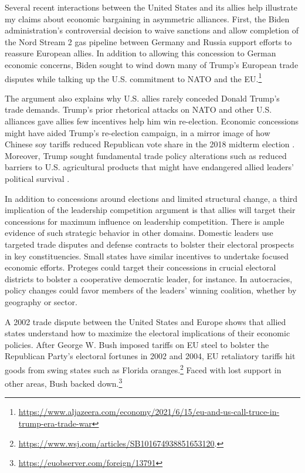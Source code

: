 \documentclass[12pt]{article}
\begin{document}
Several recent interactions between the United States and its allies help illustrate my claims about economic bargaining in asymmetric alliances. 
First, the Biden administration's controversial decision to waive sanctions and allow completion of the Nord Stream 2 gas pipeline between Germany and Russia support efforts to reassure European allies. 
In addition to allowing this concession to German economic concerns, Biden sought to wind down many of Trump's European trade disputes while talking up the U.S. commitment to NATO and the EU.\footnote{\url{https://www.aljazeera.com/economy/2021/6/15/eu-and-us-call-truce-in-trump-era-trade-war}}


The argument also explains why U.S. allies rarely conceded Donald Trump's trade demands. 
Trump's prior rhetorical attacks on NATO and other U.S. alliances gave allies few incentives help him win re-election. 
Economic concessions might have aided Trump's re-election campaign, in a mirror image of how Chinese soy tariffs reduced Republican vote share in the 2018 midterm election \citep{ChyzhUrbatsch2021}. 
Moreover, Trump sought fundamental trade policy alterations such as reduced barriers to U.S. agricultural products that might have endangered allied leaders' political survival \citep{HeeParkJensen2007}.


In addition to concessions around elections and limited structural change, a third implication of the leadership competition argument is that allies will target their concessions for maximum influence on leadership competition. 
There is ample evidence of such strategic behavior in other domains.
Domestic leaders use targeted trade disputes \citep{Conconietal2017} and defense contracts \citep{DerouenHeo2000} to bolster their electoral prospects in key constituencies.  
Small states have similar incentives to undertake focused economic efforts.
Proteges could target their concessions in crucial electoral districts to bolster a cooperative democratic leader, for instance. 
In autocracies, policy changes could favor members of the leaders' winning coalition, whether by geography or sector.


A 2002 trade dispute between the United States and Europe shows that allied states understand how to maximize the electoral implications of their economic policies. 
After George W. Bush imposed tariffs on EU steel to bolster the Republican Party's electoral fortunes in 2002 and 2004, EU retaliatory tariffs hit goods from swing states such as Florida oranges.\footnote{\url{https://www.wsj.com/articles/SB101674938851653120}.}
Faced with lost support in other areas, Bush backed down.\footnote{\url{https://euobserver.com/foreign/13791}}
\end{document}
